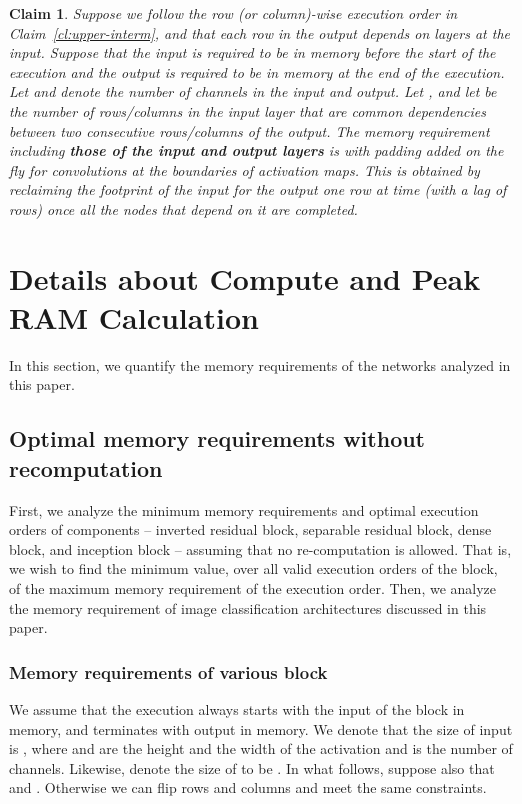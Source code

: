 \documentclass[10pt]{article}
\newtheorem{claim}{Claim}
\begin{document}
\begin{claim}
\label{cl:upper}
Suppose we follow the row (or column)-wise execution order in
Claim~\ref{cl:upper-interm}, and that each row in the output depends
on  layers at the input. Suppose that the input is required to be
in memory before the start of the execution and the output is required
to be in memory at the end of the execution. Let  and
 denote the number of channels in the input and output.  Let
, and let  be the number
of rows/columns in the input layer that are common dependencies
between two consecutive rows/columns of the output. The memory
requirement including \textbf{those of the input and output layers} is
 with
padding added on the fly for convolutions at the boundaries of
activation maps. This is obtained by reclaiming the footprint of the
input for the output one row at time (with a lag of  rows) once
all the nodes that depend on it are completed.
\end{claim}
 \section{Details about Compute and Peak RAM Calculation}
\label{sec:peak}

In this section, we quantify the memory requirements of the networks
analyzed in this paper. 




\subsection{Optimal memory requirements  without recomputation}
\label{sec:opt-mem}
First, we analyze the minimum memory requirements and optimal
execution orders of components -- inverted residual block, separable
residual block, dense block, and inception block -- assuming that no
re-computation is allowed.  That is, we wish to find the minimum
value, over all valid execution orders  of the block, of the
maximum memory requirement of the execution order.  Then, we analyze
the memory requirement of image classification architectures discussed
in this paper.

\subsubsection{Memory requirements of various block}
We assume that the
execution always starts with the input of the block in memory, and
terminates with output in memory. We denote that the size of input 
is , where  and  are the
height and the width of the activation and  is the number of
channels. Likewise, denote the size of  to be . In what follows, suppose also that  and . Otherwise we can flip rows
and columns and meet the same constraints.
\end{document}
